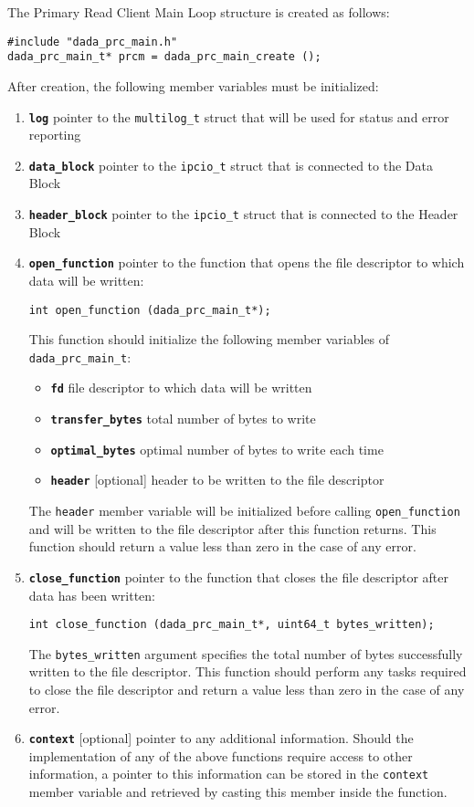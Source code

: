 The Primary Read Client Main Loop structure is created as follows:
\begin{verbatim}
#include "dada_prc_main.h"
dada_prc_main_t* prcm = dada_prc_main_create ();
\end{verbatim}
After creation, the following member variables must be initialized:
\begin{enumerate}

\item {\bf {\tt log}} pointer to the {\tt multilog\_t} struct
	that will be used for status and error reporting

\item {\bf {\tt data\_block}} pointer to the {\tt ipcio\_t} struct 
	that is connected to the Data Block

\item {\bf {\tt header\_block}} pointer to the {\tt ipcio\_t} struct
	that is connected to the Header Block

\item {\bf {\tt open\_function}} pointer to the function that opens
	the file descriptor to which data will be written:
\begin{verbatim}
int open_function (dada_prc_main_t*);
\end{verbatim}
  This function should initialize the following member
  variables of {\tt dada\_prc\_main\_t}:
\begin{itemize}
\item {\bf {\tt fd}} file descriptor to which data will be written
\item {\bf {\tt transfer\_bytes}} total number of bytes to write
\item {\bf {\tt optimal\_bytes}} optimal number of bytes to write each time
\item {\bf {\tt header}} [optional] header to be written to the file descriptor
\end{itemize}
  The {\tt header} member variable will be initialized before calling
  {\tt open\_function} and will be written to the file descriptor
  after this function returns. This function should return a value
  less than zero in the case of any error.
\newpage
\item {\bf {\tt close\_function}} pointer to the function that closes
	the file descriptor after data has been written:
\begin{verbatim}
int close_function (dada_prc_main_t*, uint64_t bytes_written);
\end{verbatim}
  The {\tt bytes\_written} argument specifies the total number of bytes
  successfully written to the file descriptor.  This function should
  perform any tasks required to close the file descriptor and return a
  value less than zero in the case of any error.

\item {\bf {\tt context}} [optional] pointer to any additional information.
  Should the implementation of any of the above functions
  require access to other information, a pointer to this information
  can be stored in the {\tt context} member variable and retrieved by
  casting this member inside the function.

\end{enumerate}
